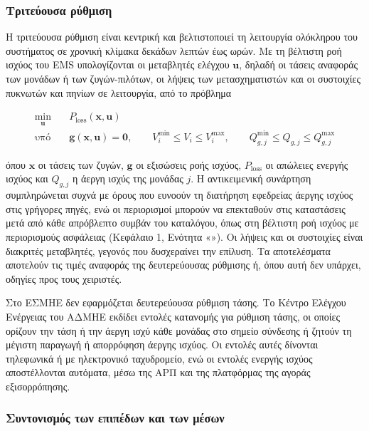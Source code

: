 \subsubsection{Τριτεύουσα ρύθμιση}

Η τριτεύουσα ρύθμιση είναι κεντρική και βελτιστοποιεί τη λειτουργία ολόκληρου του συστήματος σε
χρονική κλίμακα δεκάδων λεπτών έως ωρών. Με τη βέλτιστη ροή ισχύος του EMS υπολογίζονται οι
μεταβλητές ελέγχου $\mathbf{u}$, δηλαδή οι τάσεις αναφοράς των μονάδων ή των ζυγών-πιλότων, οι
λήψεις των μετασχηματιστών και οι συστοιχίες πυκνωτών και πηνίων σε λειτουργία, από το πρόβλημα

\begin{equation}
\begin{aligned}
\min_{\mathbf{u}} \quad & P_{\mathrm{loss}}(\mathbf{x}, \mathbf{u}) \\
\text{υπό} \quad & \mathbf{g}(\mathbf{x}, \mathbf{u}) = \mathbf{0}, \qquad
V_i^{\min} \le V_i \le V_i^{\max}, \qquad
Q_{g,j}^{\min} \le Q_{g,j} \le Q_{g,j}^{\max}
\end{aligned}
\label{eq:orpf}
\end{equation}

όπου $\mathbf{x}$ οι τάσεις των ζυγών, $\mathbf{g}$ οι εξισώσεις ροής ισχύος, $P_{\mathrm{loss}}$
οι απώλειες ενεργής ισχύος και $Q_{g,j}$ η άεργη ισχύς της μονάδας $j$. Η αντικειμενική
συνάρτηση συμπληρώνεται συχνά με όρους που ευνοούν τη διατήρηση εφεδρείας άεργης ισχύος στις
γρήγορες πηγές, ενώ οι περιορισμοί μπορούν να επεκταθούν στις καταστάσεις μετά από κάθε
απρόβλεπτο συμβάν του καταλόγου, όπως στη βέλτιστη ροή ισχύος με περιορισμούς ασφάλειας
(Κεφάλαιο 1, Ενότητα «»). Οι λήψεις και οι συστοιχίες είναι διακριτές
μεταβλητές, γεγονός που δυσχεραίνει την επίλυση. Τα αποτελέσματα αποτελούν τις τιμές αναφοράς
της δευτερεύουσας ρύθμισης ή, όπου αυτή δεν υπάρχει, οδηγίες προς τους χειριστές.

Στο ΕΣΜΗΕ δεν εφαρμόζεται δευτερεύουσα ρύθμιση τάσης. Το Κέντρο Ελέγχου Ενέργειας του ΑΔΜΗΕ
εκδίδει εντολές κατανομής για ρύθμιση τάσης, οι οποίες ορίζουν την τάση ή την άεργη ισχύ κάθε
μονάδας στο σημείο σύνδεσης ή ζητούν τη μέγιστη παραγωγή ή απορρόφηση άεργης ισχύος. Οι εντολές
αυτές δίνονται τηλεφωνικά ή με ηλεκτρονικό ταχυδρομείο, ενώ οι εντολές ενεργής ισχύος
αποστέλλονται αυτόματα, μέσω της ΑΡΠ και της πλατφόρμας της αγοράς εξισορρόπησης.

\subsubsection{Συντονισμός των επιπέδων και των μέσων}

